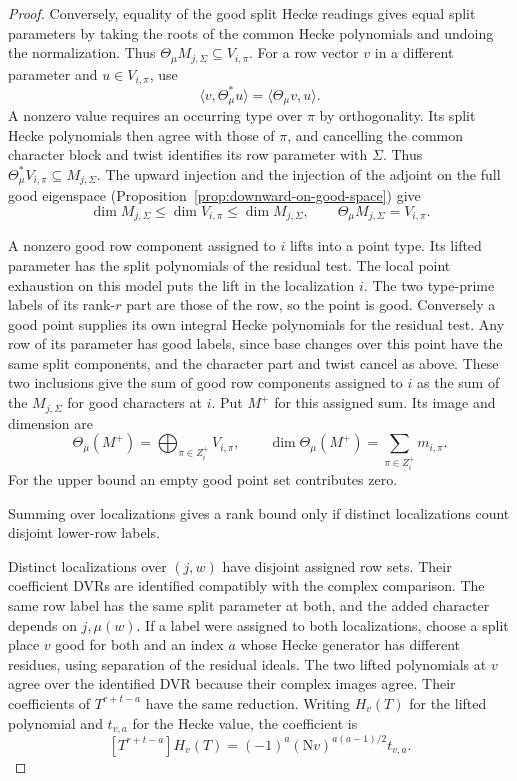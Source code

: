 \begin{proof}
Conversely, equality of the good split
Hecke readings gives equal split parameters by taking
the roots of the common Hecke polynomials and undoing
the normalization. \label{cor:selected-cut-1}
Thus \(\Theta_\mu M_{j,\Sigma}\subseteq V_{i,\pi}\).
For a row vector \(v\) in a different parameter and
\(u\in V_{i,\pi}\), use
\[
 \langle v,\Theta_\mu^*u\rangle
                    =\langle\Theta_\mu v,u\rangle .
\]
A nonzero value requires an occurring type over \(\pi\)
by orthogonality. Its split Hecke polynomials then agree
with those of \(\pi\), and cancelling the common character
block and twist identifies its row parameter with \(\Sigma\).
Thus \(\Theta_\mu^*V_{i,\pi}\subseteq M_{j,\Sigma}\).
The upward injection and the injection of the adjoint
on the full good eigenspace
(Proposition~\ref{prop:downward-on-good-space}) give
\[
 \dim M_{j,\Sigma}\le\dim V_{i,\pi}\le\dim M_{j,\Sigma},
 \qquad \Theta_\mu M_{j,\Sigma}=V_{i,\pi}.
\]

A nonzero good row component assigned to \(i\) lifts
into a point type. Its lifted parameter has the split
polynomials of the residual test. The local point exhaustion
on this model puts the lift in the localization \(i\).
The two type-prime labels of its rank-\(r\) part are those
of the row, so the point is good. Conversely a good point
supplies its own integral Hecke polynomials for the residual
test. Any row of its parameter has good labels, since
base changes over this point have the same split components,
and the character part and twist cancel as above. These
two inclusions give the sum of good row components assigned
to \(i\) as the sum of the \(M_{j,\Sigma}\) for good
characters at \(i\). Put \(M^+\) for this assigned sum. Its image and dimension are
\[
 \Theta_\mu(M^+)=\bigoplus_{\pi\in Z_i^+}V_{i,\pi},\qquad \dim\Theta_\mu(M^+)=\sum_{\pi\in Z_i^+}m_{i,\pi}.
\]
For the upper bound an empty good point set contributes zero.

Summing over localizations gives a rank bound only if distinct localizations count disjoint lower-row labels.

Distinct localizations over \((j,w)\) have disjoint
assigned row sets. Their coefficient DVRs are identified
compatibly with the complex comparison. The same row
label has the same split parameter at both, and the added
character depends on \(j,\mu(w)\). If a label were
assigned to both localizations, choose a split place \(v\)
good for both and an index \(a\) whose Hecke generator has
different residues, using separation of the residual ideals.
The two lifted polynomials at \(v\) agree over the
identified DVR because their complex images agree.
Their coefficients of \(T^{r+t-a}\) have the same
reduction. Writing \(H_v(T)\) for the lifted polynomial and \(t_{v,a}\) for the Hecke value, the coefficient is
\[
 [T^{r+t-a}]H_v(T)=(-1)^a(\mathrm Nv)^{a(a-1)/2}t_{v,a}.
\]


\end{proof}
